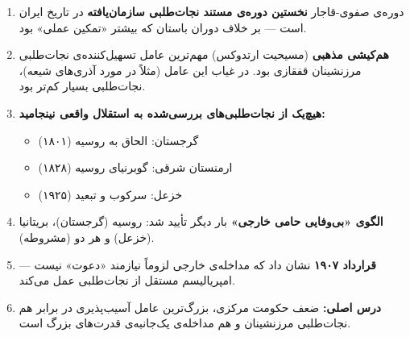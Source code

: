 \begin{tcolorbox}[wavebox, title={یافته‌های کلیدی فصل ۶}]
\begin{enumerate}[nosep, label=\textbf{\arabic*.}]
  \item دوره‌ی صفوی-قاجار \textbf{نخستین دوره‌ی مستند نجات‌طلبی سازمان‌یافته} در تاریخ ایران است — بر خلاف دوران باستان که بیشتر «تمکین عملی» بود.

  \item \textbf{هم‌کیشی مذهبی} (مسیحیت ارتدوکس) مهم‌ترین عامل تسهیل‌کننده‌ی نجات‌طلبی مرزنشینان قفقازی بود. در غیاب این عامل (مثلاً در مورد آذری‌های شیعه)، نجات‌طلبی بسیار کم‌تر بود.

  \item \textbf{هیچ‌یک از نجات‌طلبی‌های بررسی‌شده به استقلال واقعی نینجامید:}
  \begin{itemize}[nosep]
    \item گرجستان: الحاق به روسیه (۱۸۰۱)
    \item ارمنستان شرقی: گوبرنیای روسیه (۱۸۲۸)
    \item خزعل: سرکوب و تبعید (۱۹۲۵)
  \end{itemize}

  \item \textbf{الگوی «بی‌وفایی حامی خارجی»} بار دیگر تأیید شد: روسیه (گرجستان)، بریتانیا (خزعل) و هر دو (مشروطه).

  \item \textbf{قرارداد ۱۹۰۷} نشان داد که مداخله‌ی خارجی لزوماً نیازمند «دعوت» نیست — امپریالیسم مستقل از نجات‌طلبی عمل می‌کند.

  \item \textbf{درس اصلی:} ضعف حکومت مرکزی، بزرگ‌ترین عامل آسیب‌پذیری در برابر هم نجات‌طلبی مرزنشینان و هم مداخله‌ی یک‌جانبه‌ی قدرت‌های بزرگ است.
\end{enumerate}
\end{tcolorbox}

\cleardoublepage